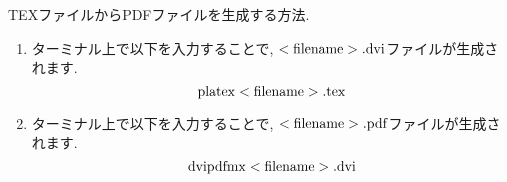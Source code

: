 \documentclass{jsarticle}
\begin{document}
TEXファイルからPDFファイルを生成する方法.
\begin{enumerate}
  \item ターミナル上で以下を入力することで, ${\rm <filename>.dvi}$ファイルが生成されます.
  \begin{equation*}
      {\rm platex <filename>.tex}
  \end{equation*}
  \item ターミナル上で以下を入力することで, ${\rm <filename>.pdf}$ファイルが生成されます.
  \begin{equation*}
    {\rm dvipdfmx <filename>.dvi}
  \end{equation*}
\end{enumerate}
\end{document}
